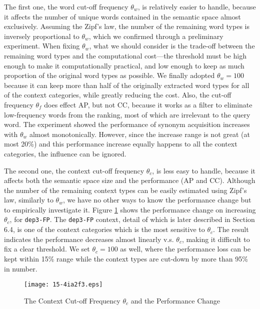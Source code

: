 \documentclass[english]{jnlp_1.4}
\begin{document}
The first one, the word cut-off frequency $\theta_w$, is relatively
easier to handle, because it affects the number of unique words
contained in the semantic space almost exclusively. Assuming the
Zipf's law, the number of the remaining word types is inversely
proportional to $\theta_w$, which we confirmed through a preliminary
experiment. When fixing $\theta_w$, what we should consider is the
trade-off between the remaining word types and the computational cost---the 
threshold must be high enough to make it computationally
practical, and low enough to keep as much proportion of the original
word types as possible. We finally adopted $\theta_w = 100$ because it
can keep more than half of the originally extracted word types for all
of the context categories, while greatly reducing the cost. Also, the
cut-off frequency $\theta_f$ does effect AP, but not CC, because it
works as a filter to eliminate low-frequency words from the ranking,
most of which are irrelevant to the query word. The experiment showed
the performance of synonym acquisition increases with $\theta_w$
almost monotonically. However, since the increase range is not great
(at most 20\%) and this performance increase equally happens to all
the context categories, the influence can be ignored.

The second one, the context cut-off frequency $\theta_c$, is less easy
to handle, because it affects both the semantic space size and the
performance (AP and CC). Although the number of the remaining context
types can be easily estimated using Zipf's law, similarly to
$\theta_w$, we have no other ways to know the performance change but
to empirically investigate it. Figure \ref{fig_cutoff_res} shows the
performance change on increasing $\theta_c$, for {\tt dep3-FP}. The
{\tt dep3-FP} context, detail of which is later described in Section
6.4, is one of the context categories which is the most sensitive to
$\theta_c$. The result indicates the performance decreases almost
linearly v.s. $\theta_c$, making it difficult to fix a clear
threshold. We set $\theta_c = 100$ as well, where the performance loss
can be kept within 15\% range while the context types are cut-down by
more than 95\% in number.

\begin{figure}[t]
\begin{center}
\texttt{[image: 15-4ia2f3.eps]}
\caption{The Context Cut-off Frequency $\theta_c$ and the Performance Change}
\label{fig_cutoff_res}
\end{center}
\end{figure}
\end{document}
